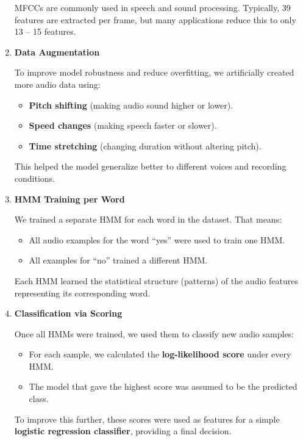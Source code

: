\documentclass[informe,english]{practicaitic}
\begin{document}
\begin{enumerate}
    MFCCs are commonly used in speech and sound processing. Typically, 39 features are extracted per frame, but many applications reduce this to only 13 – 15 features. 

    \item \textbf{Data Augmentation}

    To improve model robustness and reduce overfitting, we artificially created more audio data using:
    \begin{itemize}
        \item \textbf{Pitch shifting} (making audio sound higher or lower).
        \item \textbf{Speed changes} (making speech faster or slower).
        \item \textbf{Time stretching} (changing duration without altering pitch).
    \end{itemize}
    
    This helped the model generalize better to different voices and recording conditions.
    
    \item \textbf{HMM Training per Word}
    
    We trained a separate HMM for each word in the dataset. That means:
    \begin{itemize}
        \item All audio examples for the word “yes” were used to train one HMM.
        \item All examples for “no” trained a different HMM.
    \end{itemize}
    
    Each HMM learned the statistical structure (patterns) of the audio features representing its corresponding word.

    \item \textbf{Classification via Scoring}

    Once all HMMs were trained, we used them to classify new audio samples:
    \begin{itemize}
        \item For each sample, we calculated the \textbf{log-likelihood score} under every HMM.
        \item The model that gave the highest score was assumed to be the predicted class.
    \end{itemize}
    
    To improve this further, these scores were used as features for a simple \textbf{logistic regression classifier}, providing a final decision.

\end{enumerate}    
\end{document}
